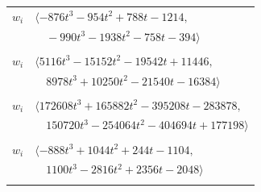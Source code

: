 \documentclass[11pt]{article}
\begin{document}
\begin{longtable}{@{}ll@{}}
$w_i$ & $\langle -876t^{3}-954t^{2}+788t-1214,$\\
 & $\quad -990t^{3}-1938t^{2}-758t-394\rangle$\\
\addlinespace[2pt]
\multicolumn{2}{@{}p{0.97\textwidth}@{}}{$i=33$, $D_i=1$, $\rho_{ij}$: $0{:}2, \allowbreak 2{:}1, \allowbreak 10{:}2, \allowbreak 15{:}2, \allowbreak 16{:}2, \allowbreak 18{:}2, \allowbreak 38{:}1, \allowbreak 39{:}1, \allowbreak 47{:}1, \allowbreak 50{:}2, \allowbreak 55{:}1, \allowbreak 56{:}1, \allowbreak 58{:}2, \allowbreak 59{:}1, \allowbreak 68{:}1, \allowbreak 69{:}2, \allowbreak 74{:}2, \allowbreak 75{:}2, \allowbreak 76{:}1, \allowbreak 79{:}2, \allowbreak 81{:}1$}\\
$w_i$ & $\langle 5116t^{3}-15152t^{2}-19542t+11446,$\\
 & $\quad 8978t^{3}+10250t^{2}-21540t-16384\rangle$\\
\addlinespace[2pt]
\multicolumn{2}{@{}p{0.97\textwidth}@{}}{$i=34$, $D_i=1$, $\rho_{ij}$: $0{:}1, \allowbreak 2{:}2, \allowbreak 9{:}2, \allowbreak 10{:}1, \allowbreak 17{:}1, \allowbreak 19{:}1, \allowbreak 20{:}1, \allowbreak 21{:}1, \allowbreak 22{:}2, \allowbreak 25{:}1, \allowbreak 29{:}2, \allowbreak 40{:}2, \allowbreak 51{:}1, \allowbreak 55{:}2, \allowbreak 56{:}2, \allowbreak 69{:}1, \allowbreak 73{:}1, \allowbreak 84{:}2, \allowbreak 89{:}2, \allowbreak 94{:}1, \allowbreak 95{:}2$}\\
$w_i$ & $\langle 172608t^{3}+165882t^{2}-395208t-283878,$\\
 & $\quad 150720t^{3}-254064t^{2}-404694t+177198\rangle$\\
\addlinespace[2pt]
\multicolumn{2}{@{}p{0.97\textwidth}@{}}{$i=35$, $D_i=1$, $\rho_{ij}$: $8{:}1, \allowbreak 13{:}1, \allowbreak 18{:}2, \allowbreak 19{:}2, \allowbreak 23{:}2, \allowbreak 32{:}2, \allowbreak 37{:}2, \allowbreak 46{:}1, \allowbreak 47{:}1, \allowbreak 48{:}1, \allowbreak 56{:}2$}\\
$w_i$ & $\langle -888t^{3}+1044t^{2}+244t-1104,$\\
 & $\quad 1100t^{3}-2816t^{2}+2356t-2048\rangle$\\
\addlinespace[2pt]
\multicolumn{2}{@{}p{0.97\textwidth}@{}}{$i=36$, $D_i=1$, $\rho_{ij}$: $3{:}1, \allowbreak 9{:}1, \allowbreak 10{:}2, \allowbreak 12{:}1, \allowbreak 14{:}1, \allowbreak 21{:}1, \allowbreak 29{:}2, \allowbreak 48{:}2, \allowbreak 49{:}1, \allowbreak 57{:}2, \allowbreak 60{:}1, \allowbreak 64{:}2, \allowbreak 68{:}2, \allowbreak 75{:}1, \allowbreak 77{:}1, \allowbreak 78{:}2, \allowbreak 81{:}2, \allowbreak 83{:}2, \allowbreak 85{:}1, \allowbreak 95{:}2$}\\

\end{longtable}
\end{document}
